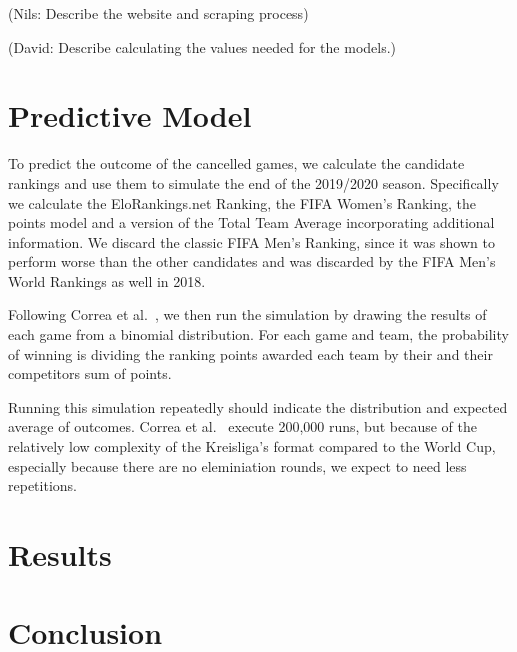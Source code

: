 \documentclass[12pt,a4paper]{article}
\begin{document}
(Nils: Describe the website and scraping process)

(David: Describe calculating the values needed for the models.)

\hypertarget{predictive-model}{%
\section{Predictive Model}\label{predictive-model}}

To predict the outcome of the cancelled games, we calculate the
candidate rankings and use them to simulate the end of the 2019/2020
season. Specifically we calculate the EloRankings.net Ranking, the FIFA
Women's Ranking, the points model and a version of the Total Team
Average incorporating additional information. We discard the classic
FIFA Men's Ranking, since it was shown to perform worse than the other
candidates and was discarded by the FIFA Men's World Rankings as well in
2018.

Following Correa et al.~\autocite*{correa}, we then run the simulation
by drawing the results of each game from a binomial distribution. For
each game and team, the probability of winning is dividing the ranking
points awarded each team by their and their competitors sum of points.

Running this simulation repeatedly should indicate the distribution and
expected average of outcomes. Correa et al.~\autocite*{correa} execute
200,000 runs, but because of the relatively low complexity of the
Kreisliga's format compared to the World Cup, especially because there
are no eleminiation rounds, we expect to need less repetitions.

\hypertarget{results}{%
\section{Results}\label{results}}

\hypertarget{conclusion}{%
\section{Conclusion}\label{conclusion}}

\newpage
\end{document}
